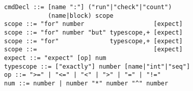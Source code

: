 \begin{small}
\begin{Verbatim}
cmdDecl ::= [name ":"] ("run"|"check"|"count")
            (name|block) scope
scope ::= "for" number                   [expect]
scope ::= "for" number "but" typescope,+ [expect]
scope ::= "for"              typescope,+ [expect]
scope ::=                                [expect]
expect ::= "expect" [op] num
typescope ::= ["exactly"] number [name|"int"|"seq"]
op ::= ">=" | "<=" | "<" | ">" | "=" | "!=" 
num ::= number | number "*" number "^" number
\end{Verbatim}
\end{small}
